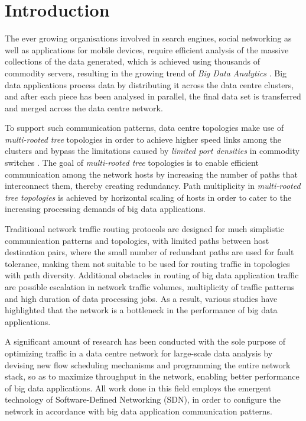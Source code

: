\chapter{Introduction}


The ever growing organisations involved in search engines, social networking as well as applications for mobile devices, require efficient analysis of the massive collections of the data generated, which is achieved using thousands of commodity servers, resulting in the growing trend of \textit{Big Data Analytics} \cite{mcafee2012big}. Big data applications process data by distributing it across the data centre clusters, and after each piece has been analysed in parallel, the final data set is transferred and merged across the data centre network.

To support such communication patterns, data centre topologies make use of \textit{multi-rooted tree} topologies in order to achieve higher speed links among the clusters and bypass the limitations caused by \textit{limited port densities} in commodity switches \cite{al2010hedera}. The goal of \textit{multi-rooted tree} topologies is to enable efficient communication among the network hosts by increasing the number of paths that interconnect them, thereby creating redundancy. Path multiplicity in \textit{multi-rooted tree topologies} is achieved by horizontal scaling of hosts \cite{al2008scalable, greenberg2009vl2, guo2008dcell,guo2009bcube} in order to cater to the increasing processing demands of big data applications.

Traditional network traffic routing protocols are designed for much simplistic communication patterns and topologies, with limited paths between host destination pairs, where the small number of redundant paths are used for fault tolerance, making them not suitable to be used for routing traffic in topologies with path diversity. Additional obstacles in routing of big data application traffic are possible escalation in network traffic volumes, multiplicity of traffic patterns and high duration of data processing jobs. As a result, various studies \cite{al2010hedera, greenberg2009vl2,guo2008dcell} have highlighted that the network is a bottleneck in the performance of big data applications. 

A significant amount of research \cite{das2013transparent, wang2012programming, al2010hedera, narayan2012hadoop, neves2014pythia, wette2015hybridte} has been conducted with the sole purpose of optimizing traffic in a data centre network for large-scale data analysis by devising new flow scheduling mechanisms and programming the entire network stack, so as to maximize throughput in the network, enabling better performance of big data applications. All work done in this field employs the emergent technology of Software-Defined Networking (SDN), in order to configure the network in accordance with big data application communication patterns.  

